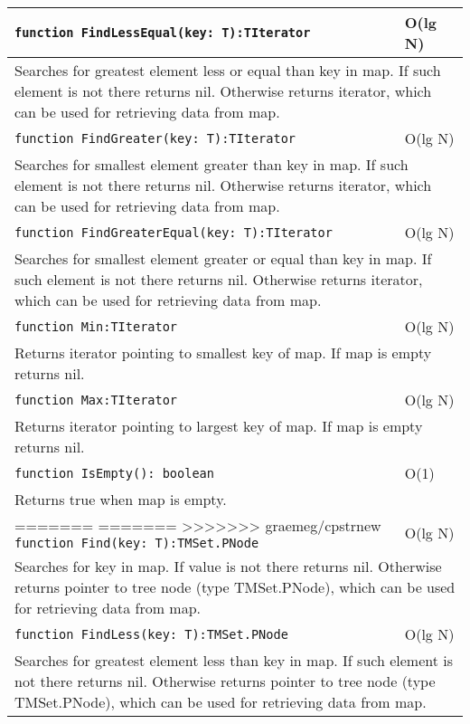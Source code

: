 \begin{longtable}{|m{10cm}|m{5cm}|}
\verb!function FindLessEqual(key: T):TIterator! & O(lg N) \\\hline
\multicolumn{2}{|m{15cm}|}{Searches for greatest element less or equal than key in map. If such element is not there returns nil. Otherwise
returns iterator, which can be used for retrieving data from map.} \\\hline\hline

\verb!function FindGreater(key: T):TIterator! & O(lg N) \\\hline
\multicolumn{2}{|m{15cm}|}{Searches for smallest element greater than key in map. If such element is not there returns nil. Otherwise
returns iterator, which can be used for retrieving data from map.} \\\hline\hline

\verb!function FindGreaterEqual(key: T):TIterator! & O(lg N) \\\hline
\multicolumn{2}{|m{15cm}|}{Searches for smallest element greater or equal than key in map. If such element is not there returns nil. Otherwise
returns iterator, which can be used for retrieving data from map.} \\\hline\hline

\verb!function Min:TIterator! & O(lg N) \\\hline
\multicolumn{2}{|m{15cm}|}{Returns iterator pointing to smallest key of map. If map is empty returns
nil.} \\\hline\hline

\verb!function Max:TIterator! & O(lg N) \\\hline
\multicolumn{2}{|m{15cm}|}{Returns iterator pointing to largest key of map. If map is empty returns
nil.} \\\hline\hline

\verb!function IsEmpty(): boolean! & O(1) \\ \hline
\multicolumn{2}{|m{15cm}|}{Returns true when map is empty.} \\\hline

=======
=======
>>>>>>> graemeg/cpstrnew
\verb!function Find(key: T):TMSet.PNode! & O(lg N) \\\hline
\multicolumn{2}{|m{15cm}|}{Searches for key in map. If value is not there returns nil. Otherwise
returns pointer to tree node (type TMSet.PNode), which can be used for retrieving data from map.} \\\hline\hline

\verb!function FindLess(key: T):TMSet.PNode! & O(lg N) \\\hline
\multicolumn{2}{|m{15cm}|}{Searches for greatest element less than key in map. If such element is not there returns nil. Otherwise
returns pointer to tree node (type TMSet.PNode), which can be used for retrieving data from map.} \\\hline\hline


\end{longtable}
